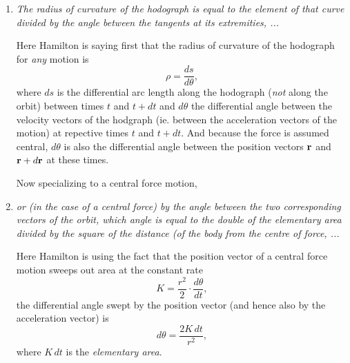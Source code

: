 \documentclass{ximera}
\begin{document}
\begin{enumerate}
\item \emph{The radius of curvature of the hodograph is equal to the element of that curve divided by the angle between the tangents at its extremities, ...} %

Here Hamilton is saying first that the radius of curvature of the hodograph for \emph{any} motion is
\[
   \rho = \frac{ds}{d\theta}, %
\]
where $ds$ is the differential arc length along the hodograph (\emph{not} along the orbit) between times $t$ and $t+dt$ and $d \theta$ the differential angle between the velocity vectors of the hodgraph (ie. between the acceleration vectors of the motion) at repective times $t$ and $t + dt$. And because the force is assumed central, $d\theta$ is also the differential angle between the position vectors ${\bf r}$ and ${\bf r}+d{\bf r}$ at these times. 

Now specializing to a central force motion, 

\item \emph{or (in the case of a central force) by the angle between the two corresponding vectors of the orbit, which angle is equal to the double of the elementary area divided by the square of the distance (of the body from the centre of force, ...}

Here Hamilton is using the fact that the position vector of a central force motion sweeps out area at the constant rate 
\[
  K = \frac{r^2}{2}\cdot \frac{d\theta}{dt},
\]
the differential angle swept by the position vector (and hence also by the acceleration vector) is
\[
 d\theta =   \frac{2K \, dt}{r^2} ,
\]
where $K\, dt$ is the \emph{elementary area}.

 

\end{enumerate}
\end{document}
